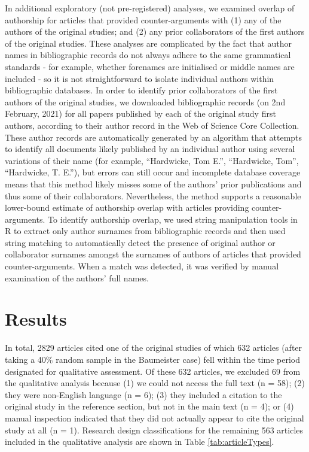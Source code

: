 \documentclass[
  american,
  ,man,floatsintext]{apa6}
\begin{document}
In additional exploratory (not pre-registered) analyses, we examined overlap of authorship for articles that provided counter-arguments with (1) any of the authors of the original studies; and (2) any prior collaborators of the first authors of the original studies. These analyses are complicated by the fact that author names in bibliographic records do not always adhere to the same grammatical standards - for example, whether forenames are initialised or middle names are included - so it is not straightforward to isolate individual authors within bibliographic databases. In order to identify prior collaborators of the first authors of the original studies, we downloaded bibliographic records (on 2nd February, 2021) for all papers published by each of the original study first authors, according to their author record in the Web of Science Core Collection. These author records are automatically generated by an algorithm that attempts to identify all documents likely published by an individual author using several variations of their name (for example, \enquote{Hardwicke, Tom E.}, \enquote{Hardwicke, Tom}, \enquote{Hardwicke, T. E.}), but errors can still occur and incomplete database coverage means that this method likely misses some of the authors' prior publications and thus some of their collaborators. Nevertheless, the method supports a reasonable lower-bound estimate of authorship overlap with articles providing counter-arguments. To identify authorship overlap, we used string manipulation tools in R to extract only author surnames from bibliographic records and then used string matching to automatically detect the presence of original author or collaborator surnames amongst the surnames of authors of articles that provided counter-arguments. When a match was detected, it was verified by manual examination of the authors' full names.

\hypertarget{results}{%
\section{Results}\label{results}}

In total, 2829 articles cited one of the original studies of which 632 articles (after taking a 40\% random sample in the Baumeister case) fell within the time period designated for qualitative assessment. Of these 632 articles, we excluded 69 from the qualitative analysis because (1) we could not access the full text (n = 58); (2) they were non-English language (n = 6); (3) they included a citation to the original study in the reference section, but not in the main text (n = 4); or (4) manual inspection indicated that they did not actually appear to cite the original study at all (n = 1). Research design classifications for the remaining 563 articles included in the qualitative analysis are shown in Table \ref{tab:articleTypes}.
\end{document}
